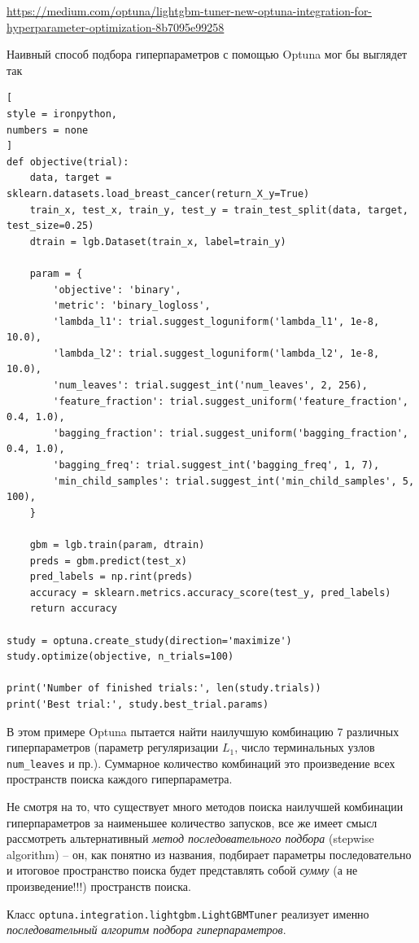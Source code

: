 \documentclass[%
	11pt,
	a4paper,
	utf8,
		]{article}
\begin{document}
\url{https://medium.com/optuna/lightgbm-tuner-new-optuna-integration-for-hyperparameter-optimization-8b7095e99258}

Наивный способ подбора гиперпараметров с помощью Optuna мог бы выглядет так
\begin{lstlisting}[
style = ironpython,
numbers = none
]
def objective(trial):
	data, target = sklearn.datasets.load_breast_cancer(return_X_y=True)
	train_x, test_x, train_y, test_y = train_test_split(data, target, test_size=0.25)
	dtrain = lgb.Dataset(train_x, label=train_y)

	param = {
		'objective': 'binary',
		'metric': 'binary_logloss',
		'lambda_l1': trial.suggest_loguniform('lambda_l1', 1e-8, 10.0),
		'lambda_l2': trial.suggest_loguniform('lambda_l2', 1e-8, 10.0),
		'num_leaves': trial.suggest_int('num_leaves', 2, 256),
		'feature_fraction': trial.suggest_uniform('feature_fraction', 0.4, 1.0),
		'bagging_fraction': trial.suggest_uniform('bagging_fraction', 0.4, 1.0),
		'bagging_freq': trial.suggest_int('bagging_freq', 1, 7),
		'min_child_samples': trial.suggest_int('min_child_samples', 5, 100),
	}

	gbm = lgb.train(param, dtrain)
	preds = gbm.predict(test_x)
	pred_labels = np.rint(preds)
	accuracy = sklearn.metrics.accuracy_score(test_y, pred_labels)
	return accuracy

study = optuna.create_study(direction='maximize')
study.optimize(objective, n_trials=100)

print('Number of finished trials:', len(study.trials))
print('Best trial:', study.best_trial.params)
\end{lstlisting}

В этом примере Optuna пытается найти наилучшую комбинацию 7 различных гиперпараметров (параметр регуляризации $ L_1 $, число терминальных узлов \verb|num_leaves| и пр.). Суммарное количество комбинаций это произведение всех пространств поиска каждого гиперпараметра.

Не смотря на то, что существует много методов поиска наилучшей комбинации гиперпараметров за наименьшее количество запусков, все же имеет смысл рассмотреть альтернативный \emph{метод последовательного подбора} (stepwise algorithm) -- он, как понятно из названия, подбирает параметры последовательно и итоговое пространство поиска будет представлять собой \emph{сумму} (а не произведение!!!) пространств поиска. 

{\color{blue}Класс \verb|optuna.integration.lightgbm.LightGBMTuner| реализует именно \emph{последовательный алгоритм подбора гиперпараметров}.}
\end{document}
